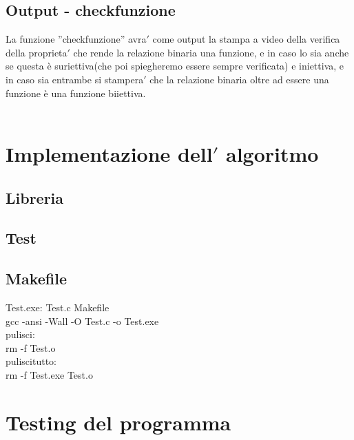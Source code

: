 \documentclass[11pt, a4paper, titlepage, block]{article}
\begin{document}
	\subsection{Output - check\textunderscore funzione}
	La funzione ”check\textunderscore funzione” avra$'$  come output la stampa a video della verifica della proprieta$'$  che rende la relazione binaria una funzione, e in caso lo sia anche se questa \`e  suriettiva(che poi spiegheremo essere sempre verificata) e iniettiva, e in caso sia entrambe si stampera$'$  che la relazione binaria oltre ad essere una funzione \`e  una funzione biiettiva.\\
	\\
	\newpage
	\section{Implementazione dell$'$ algoritmo}
	\subsection{Libreria}
	\lstset{numbers=left, tabsize=2,breaklines=true, language=C}
	 
	\newpage
	\subsection{Test}
	\lstset{numbers=left, tabsize=2,breaklines=true, language=C}
	
	\newpage
	\subsection{Makefile}
	Test.exe: Test.c Makefile\\
	gcc -ansi -Wall -O Test.c -o Test.exe\\
	pulisci:\\
	rm -f Test.o\\
	pulisci\textunderscore tutto:\\
	rm -f Test.exe Test.o\\
	
	
	
	
	
	
	
	\newpage
	\section{Testing del programma}
\end{document}
